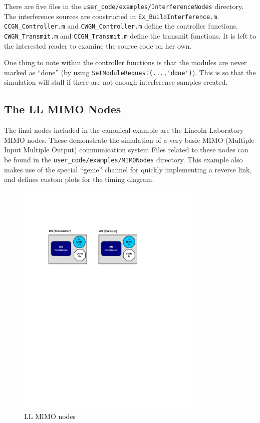 There are five files in the \verb+user_code/examples/InterferenceNodes+
directory. The interference sources are constructed in
\verb+Ex_BuildInterference.m+.  \verb+CCGN_Controller.m+ and
\verb+CWGN_Controller.m+ define the controller functions.
\verb+CWGN_Transmit.m+ and \verb+CCGN_Transmit.m+ define the
transmit functions. It is left to the interested reader to examine
the source code on her own.

One thing to note within the controller functions is that the
modules are never marked as ``done'' (by using
\verb+SetModuleRequest(...,'done')+). This is so that the simulation
will stall if there are not enough interference samples created.

\subsection{The LL MIMO Nodes}\label{sec:llmimoNodes}

The final nodes included in the canonical example are the Lincoln
Laboratory MIMO nodes.  These demonstrate the simulation of a very
basic MIMO (Multiple Input Multiple Output) communication system
Files related to these nodes can be found in the
\verb+user_code/examples/MIMONodes+ directory.
This example also makes use of the special ``genie'' channel for
quickly implementing a reverse link, and defines custom plots for
the timing diagram.

\begin{figure}[h]
\centering
\includegraphics[width=3.5in]{figs/LL_MIMO_Example}
\caption{LL MIMO nodes} \label{fig:llmimoNodes}
\end{figure}

